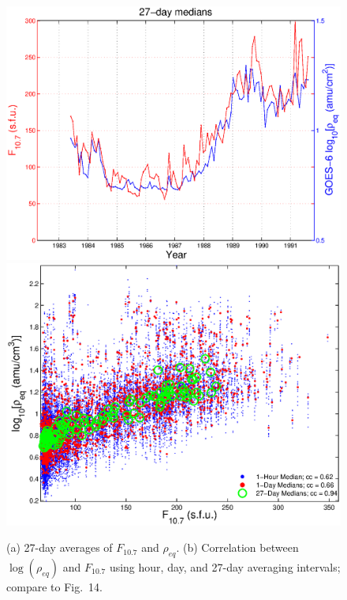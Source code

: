 \documentclass[10pt,twocolumn]{article}
\begin{document}
\begin{figure}[htp!]
\centering
\includegraphics[scale=0.40]{paperfigures/F107MD27d-GOES6.eps}
\includegraphics[scale=0.40]{paperfigures/ccplot-GOES6.eps}
\caption{(a) 27-day averages of $F_{10.7}$ and $\rho_{eq}$. (b) Correlation between $\log(\rho_{eq})$ and $F_{10.7}$ using hour, day, and 27-day averaging intervals; compare to \cite{Takahashi2010} Fig.~14.}
\label{ccplot}
\end{figure}
\clearpage
\end{document}
